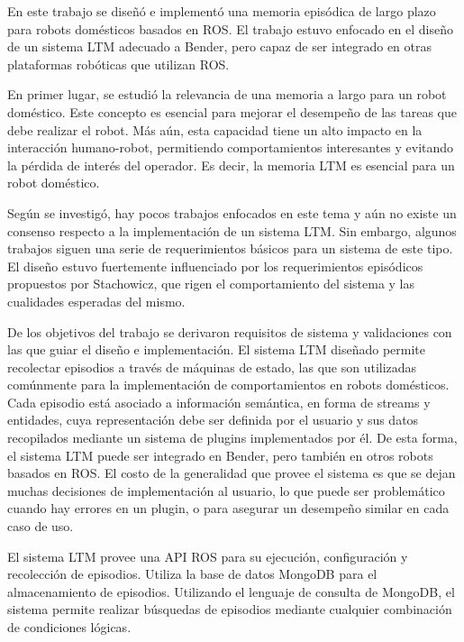 \begin{conclusion}

En este trabajo se diseñó e implementó una memoria episódica de largo plazo para robots domésticos basados en ROS. El trabajo estuvo enfocado en el diseño de un sistema LTM adecuado a Bender, pero capaz de ser integrado en otras plataformas robóticas que utilizan ROS.

En primer lugar, se estudió la relevancia de una memoria a largo para un robot doméstico. Este concepto es esencial para mejorar el desempeño de las tareas que debe realizar el robot. Más aún, esta capacidad tiene un alto impacto en la interacción humano-robot, permitiendo comportamientos interesantes y evitando la pérdida de interés del operador. Es decir, la memoria LTM es esencial para un robot doméstico.

Según se investigó, hay pocos trabajos enfocados en este tema y aún no existe un consenso respecto a la implementación de un sistema LTM. Sin embargo, algunos trabajos siguen una serie de requerimientos básicos para un sistema de este tipo. El diseño estuvo fuertemente influenciado por los requerimientos episódicos propuestos por Stachowicz, que rigen el comportamiento del sistema y las cualidades esperadas del mismo.

De los objetivos del trabajo se derivaron requisitos de sistema y validaciones con las que guiar el diseño e implementación. El sistema LTM diseñado permite recolectar episodios a través de máquinas de estado, las que son utilizadas comúnmente para la implementación de comportamientos en robots domésticos. Cada episodio está asociado a información semántica, en forma de streams y entidades, cuya representación debe ser definida por el usuario y sus datos recopilados mediante un sistema de plugins implementados por él. De esta forma, el sistema LTM puede ser integrado en Bender, pero también en otros robots basados en ROS. El costo de la generalidad que provee el sistema es que se dejan muchas decisiones de implementación al usuario, lo que puede ser problemático cuando hay errores en un plugin, o para asegurar un desempeño similar en cada caso de uso.

El sistema LTM provee una API ROS para su ejecución, configuración y recolección de episodios. Utiliza la base de datos MongoDB para el almacenamiento de episodios. Utilizando el lenguaje de consulta de MongoDB, el sistema permite realizar búsquedas de episodios mediante cualquier combinación de condiciones lógicas.



\end{conclusion}
